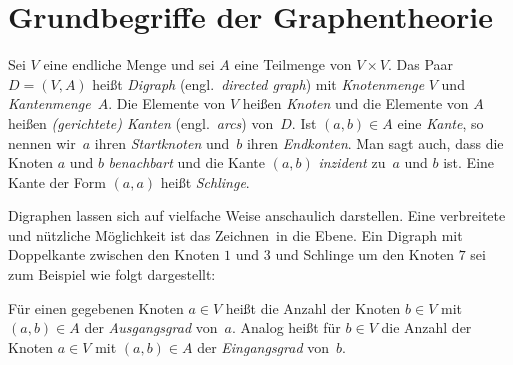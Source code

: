 


\section{Grundbegriffe der Graphentheorie}

\begin{defn}
Sei $V$ eine endliche Menge und sei $A$ eine Teilmenge von $V \times V$.
Das Paar $D=(V,A)$ heißt \emph{Digraph} (engl.~\emph{directed graph}) mit \emph{Knotenmenge} $V$ und \emph{Kantenmenge}~$A$.
Die Elemente von $V$ heißen \emph{Knoten} und die Elemente von $A$ heißen \emph{(gerichtete) Kanten} (engl.~\emph{arcs}) von~$D$.
Ist $(a,b) \in A$ eine \emph{Kante}, so nennen wir~$a$ ihren \emph{Startknoten} und~$b$ ihren \emph{Endkonten}.
Man sagt auch, dass die Knoten $a$ und $b$ \emph{benachbart} und die Kante $(a,b)$ \emph{inzident} zu~$a$ und $b$ ist.
Eine Kante der Form $(a,a)$ heißt \emph{Schlinge}.
\end{defn}

\begin{bsp} 
Digraphen lassen sich auf vielfache Weise anschaulich darstellen.
Eine verbreitete und nützliche Möglichkeit ist das \glqq Zeichnen\grqq\ in die Ebene.
Ein Digraph mit Doppelkante zwischen den Knoten $1$ und $3$ und Schlinge um den Knoten $7$ sei zum Beispiel wie folgt dargestellt:

\begin{center}
\end{center}
\end{bsp} 

\begin{defn}
Für einen gegebenen Knoten $a \in V$ heißt die Anzahl der Knoten $b \in V$ mit $(a,b) \in A$ der \emph{Ausgangsgrad} von~$a$.
Analog heißt für $b \in V$ die Anzahl der Knoten $a \in V$ mit $(a,b) \in A$ der \emph{Eingangsgrad} von~$b$.
\end{defn} 

